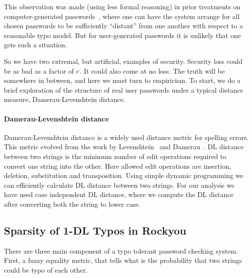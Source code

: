 This observation was made (using less formal reasoning) in prior
treatments on computer-generated
passwords~\cite{shay2012correct,techreport}, where one can have the
system arrange for all chosen passwords to be sufficiently ``distant''
from one another with respect to a reasonable typo model. But for
user-generated passwords it is unlikely that one gets such a
situation.

So we have two extremal, but artificial, examples of
security. Security loss could be as bad as a factor of $c$. It
could also come at no loss. The truth will be somewhere in between,
and here we must turn to empiricism. To start, we do a brief
exploration of the structure of real user passwords under a typical
distance measure, Damerau-Levenshtein distance.


\paragraph{Damerau-Levenshtein distance} Damerau-Levenshtein distance
is a widely used distance metric for spelling errors. This metric
evolved from the work by Levenshtein~\cite{levenshtein1966binary} and
Damerau~\cite{damerau1964technique}.  DL distance between two strings
is the minimum number of edit operations required to convert one
string into the other. Here allowed edit operations are insertion,
deletion, substitution and transposition.  Using simple dynamic
programming we can efficiently calculate DL distance between two
strings.  For our analysis we have used case independent DL distance,
where we compute the DL distance after converting both the string to
lower case.


\subsection{Sparsity of 1-DL Typos in Rockyou}
\fi





\iffalse

\bigskip
\bigskip
\bigskip

There are three main component of a typo tolerant password checking system. 
First, a fuzzy equality metric, that tells what is the probability that two
strings could be typo of each other.


